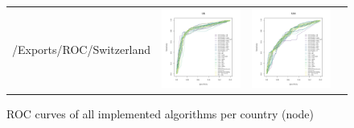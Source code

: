 \documentclass[twoside,twocolumn]{article}
\begin{document}
\begin{figure}
\begin{tabular}{cccc}
/Exports/ROC/Switzerland} &       \includegraphics[width=45mm]{../1. Code/Implied Volatility/Exports/ROC/UK} &  \includegraphics[width=45mm]{../1. Code/Implied Volatility/Exports/ROC/USA}  \\
\end{tabular}
\caption[ROC curves of all implemented algorithms per country (node)]{ROC curves of all implemented algorithms per  country (node)}
  \label{fig:roccurves}
\end{figure}
\end{document}
